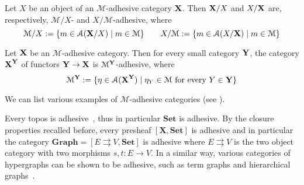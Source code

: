 \documentclass[a4paper,UKenglish,cleveref,pdftex, thm-restate,numberwithinsect,anonymous]{lipics}
\newcommand{\reg}{\mathsf{Reg}}
\newcommand{\cat}[1]{\ensuremath{\mathbf{#1}}}
\def\A{\textbf {\textup{A}}}
\def\B{\textbf {\textup{B}}}
\def\C{\textbf {\textup{C}}}
\def\X{\textbf {\textup{X}}}
\def\Y{\textbf {\textup{Y}}}
\newcommand{\comma}[2]{#1\hspace{1pt} {\downarrow}\hspace{1pt} #2}
\newcommand{\cma}[2]{\mathcal{#1}\hspace{1pt} {\downarrow}\hspace{1pt} \mathcal{#2}}
\begin{document}

\begin{theorem}\label{cor:slice}
  Let $X$ be an object of an $\mathcal{M}$-adhesive category
  $\X$. Then $\X/X$ and $X/\X$ are, respectively, $\mathcal{M}/X$-
  and $X/\mathcal{M}$-adhesive, where
  \[\mathcal{M}/X:=\{m\in \mathcal{A}(\X/X) \mid m\in \mathcal{M} \}
    \qquad X/\mathcal{M}:=\{m\in \mathcal{A}(X/\X) \mid m\in
    \mathcal{M} \}
  \]
\end{theorem}


\begin{theorem}
  \label{thm:functors}
  Let $\X$ be an $\mathcal{M}$-adhesive category. Then for every small
  category $\Y$, the category $\X^\Y$ of functors $\Y\to \X$ is
  $\mathcal{M}^{\Y}$-adhesive, where
  \[\mathcal{M}^{\Y}:=\{\eta \in \mathcal{A}(\X^\Y) \mid \eta_Y \in
    \mathcal{M} \text{ for every } Y\in \Y\}\]
\end{theorem}

We can list various examples of $\mathcal{M}$-adhesive categories (see
\cite{castelnovo2023thesis,CastelnovoGM22,lack2006toposes}).


\begin{example}
  \label{ex:adhesive}
  Every topos is adhesive~\cite{lack2006toposes}, thus in particular
  $\cat{Set}$ is adhesive. By the closure properties recalled before,
  every presheaf $[\cat{X},\cat{Set}]$ is adhesive and in particular
  the category $\cat{Graph} = [ E \rightrightarrows V, \cat{Set}]$ is
  adhesive where $E \rightrightarrows {V}$ is the two object category
  with two morphisms $s,t \colon{E} \to {V}$. In a similar way,
  various categories of hypergraphs can be shown to be adhesive, 
  such as term graphs and hierarchical graphs~\cite{CastelnovoGM24}.
\end{example}
\end{document}
